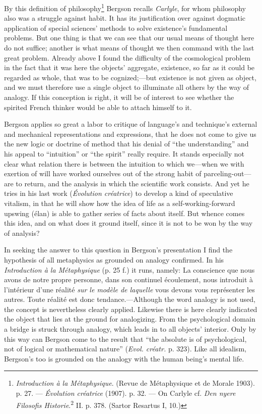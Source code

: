 \documentclass[12pt,a4paper]{book}
\newcommand{\opage}[1]{\marginnote{\footnotesize\textit{[#1]}}}
\begin{document}
By this definition of philosophy\footnote{\emph{Introduction à la Métaphysique}. (Revue de
Métaphysique et de Morale 1903). p. 27. --- \emph{Évolution créatrice} (1907). p. 32. --- On Carlyle
cf. \emph{Den nyere Filosofis Historie}.\textsuperscript{2} II. p. 378. (Sartor Resartus I, 10.)}
Bergson recalls \emph{Carlyle}, for whom philosophy also was a struggle against habit. It has its
justification over against dogmatic application of special sciences' methods to solve existence's
fundamental problems. But one thing is that we can see that our usual means of thought here do not
suffice; another is what means of thought we then command with the last great problem. Already above I
found the difficulty of the cosmological problem in the fact that it was here the objects' aggregate,
existence, so far as it could be regarded as whole, that was to be cognized;---but existence is not
given as object, and we must therefore use a single object to illuminate all others by the way of
analogy. If this conception is right, it will be of interest to see whether the spirited French thinker
would be able to attach himself to it.

Bergson applies so great a labor to critique of language's and technique's external and mechanical
representations and expressions, that he does not come to give us the new logic or doctrine of method
that his denial of ``the understanding'' and his appeal to ``intuition'' or ``the spirit'' really
require. It stands especially not clear what relation there is between the intuition to which we---when
we with exertion of will have worked ourselves out of the strong habit of parceling-out---are to return,
and the analysis in which the scientific work consists. And yet he tries in his last work
(\emph{Évolution créatrice}) to develop a kind of speculative vitalism, in that he will show how the
idea of life as a self-working-forward upswing (élan) is able to gather series of facts about itself.
But whence comes this idea, and on what does it ground itself, since it is not to be won by the way of
analysis?

In seeking the answer to this question in Bergson's presentation I find the hypothesis of all
metaphysics as grounded \opage{318}on analogy confirmed. In his \emph{Introduction à la Métaphysique} (p. 25 f.)
it runs, namely: La conscience que nous avons de notre propre personne, dans son continuel écoulement,
nous introduit à l'intérieur d'une réalité \emph{sur le modèle de laquelle} vous devons vous
représenter les autres. Toute réalité est donc tendance.---Although the word analogy is not used, the
concept is nevertheless clearly applied. Likewise there is here clearly indicated the object that lies
at the ground for analogizing. From the psychological domain a bridge is struck through analogy, which leads in to all objects' interior. Only by this way can Bergson come to the result that ``the
absolute is of psychological, not of logical or mathematical nature'' (\emph{Evol. créatr.} p. 323).
Like all idealism, Bergson's too is grounded on the analogy with the human being's mental life.
\end{document}

